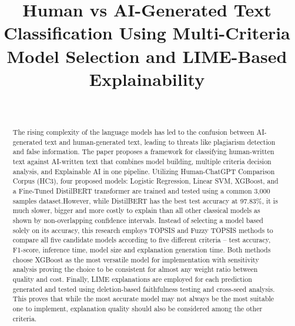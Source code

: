 \documentclass[conference]{IEEEtran}
\begin{document}
\title{Human vs AI-Generated Text Classification Using Multi-Criteria Model Selection and LIME-Based Explainability\\
{\footnotesize \textsuperscript{}}
}

\author{
\\[2ex] %
\IEEEauthorblockN{
}
}


\maketitle

\begin{abstract}
The rising complexity of the language models has led to the confusion between AI-generated text and human-generated text, leading to threats like plagiarism detection and false information. The paper proposes a framework for classifying human-written text against AI-written text that combines model building, multiple criteria decision analysis, and Explainable AI in one pipeline. Utilizing Human-ChatGPT Comparison Corpus (HC3), four proposed models: Logistic Regression, Linear SVM, XGBoost, and a Fine-Tuned DistilBERT transformer are trained and tested using a common 3,000 samples dataset.However, while DistilBERT has the best test accuracy at 97.83\%, it is much slower, bigger and more costly to explain than all other classical models as shown by non-overlapping confidence intervals. Instead of selecting a model based solely on its accuracy, this research employs TOPSIS and Fuzzy TOPSIS methods to compare all five candidate models according to five different criteria – test accuracy, F1-score, inference time, model size and explanation generation time. Both methods choose XGBoost as the most versatile model for implementation with sensitivity analysis proving the choice to be consistent for almost any weight ratio between quality and cost. Finally, LIME explanations are employed for each prediction generated and tested using deletion-based faithfulness testing and cross-seed analysis. This proves that while the most accurate model may not always be the most suitable one to implement, explanation quality should also be considered among the other criteria.
\end{abstract}
\end{document}
